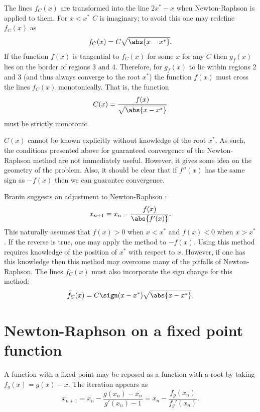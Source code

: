 \documentclass{article}
\begin{document}
The lines $f_C(x)$ are transformed into the line $2 x^* - x$ when Newton-Raphson is applied to them.
For $x < x^*$ $C$ is imaginary; to avoid this one may redefine $f_C(x)$ as
\begin{equation}
f_C(x) = C \sqrt{\abs{x - x^*}} .
\end{equation}
If the function $f(x)$ is tangential to $f_C(x)$ for some $x$ for any $C$ then $g_f(x)$ lies on the border of regions 3 and 4.
Therefore, for $g_f(x)$ to lie within regions 2 and 3 (and thus always converge to the root $x^*$) the function $f(x)$ must cross the lines $f_C(x)$ monotonically.
That is, the function
\begin{equation*}
C(x) = \frac{f(x)}{\sqrt{\abs{x-x^*}}}
\end{equation*}
must be strictly monotonic.

$C(x)$ cannot be known explicitly without knowledge of the root $x^*$.
As such, the conditions presented above for guaranteed convergence of the Newton-Raphson method are not immediately useful.
However, it gives some idea on the geometry of the problem.
Also, it should be clear that if $f''(x)$ has the same sign as $-f(x)$ then we can guarantee convergence.

Branin suggests an adjustment to Newton-Raphson \cite{branin1972widely}:
\begin{equation*}
x_{n+1} = x_n - \frac{f(x)}{\abs{f'(x)}} .
\end{equation*}
This naturally assumes that $f(x) > 0$ when $x < x^*$ and $f(x) < 0$ when $x > x^*$.
If the reverse is true, one may apply the method to $-f(x)$.
Using this method requires knowledge of the position of $x^*$ with respect to $x$.
However, if one has this knowledge then this method may overcome many of the pitfalls of Newton-Raphson.
The lines $f_C(x)$ must also incorporate the sign change for this method:
\begin{equation*}
f_C(x) = C \sign(x - x^*) \sqrt{\abs{x-x^*}} .
\end{equation*}

\section{Newton-Raphson on a fixed point function}
\label{sec:nrfp}

A function with a fixed point may be reposed as a function with a root by taking $f_g(x) = g(x) - x$.
The iteration appears as
\begin{equation*}
x_{n+1} = x_n - \frac{g(x_n) - x_n}{g'(x_n) - 1} = x_n - \frac{f_g(x_n)}{f_g'(x_n)} .
\end{equation*}
\end{document}
